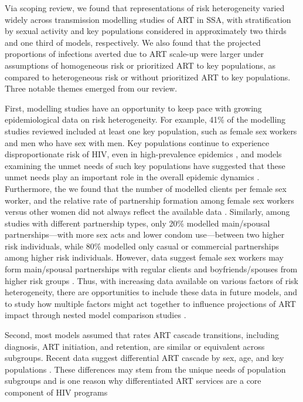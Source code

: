 Via scoping review, we found that representations of risk heterogeneity varied widely across
transmission modelling studies of ART in SSA, with
stratification by sexual activity and key populations considered in approximately
two thirds and one third of models, respectively.
We also found that the projected proportions of infections averted due to ART scale-up were
larger under assumptions of homogeneous risk or prioritized ART to key populations,
as compared to heterogeneous risk or without prioritized ART to key populations.
Three notable themes emerged from our review.
\par
First, modelling studies have an opportunity to keep pace with growing epidemiological data on risk heterogeneity.
For example, 41\% of the modelling studies reviewed included at least one key population,
such as female sex workers and men who have sex with men.
Key populations continue to experience disproportionate risk of HIV, even in high-prevalence epidemics \cite{AIDSinfo},
and models examining the unmet needs of such key populations have suggested that
these unmet needs play an important role in the overall epidemic dynamics \cite{Stone2021,Bekker2015}.
Furthermore, the we found that the number of modelled clients per female sex worker, and
the relative rate of partnership formation among female sex workers versus other women
did not always reflect the available data \cite{Watts2010,Scorgie2012}.
Similarly, among studies with different partnership types, only 20\% modelled
main/spousal partnerships---with more sex acts and lower condom use---between two higher risk individuals,
while 80\% modelled only casual or commercial partnerships among higher risk individuals.
However, data suggest female sex workers may form main/spousal partnerships
with regular clients and boyfriends/spouses from higher risk groups \cite{Scorgie2012}.
Thus, with increasing data available on various factors of risk heterogeneity,
there are opportunities to include these data in future models,
and to study how multiple factors might act together to influence projections of ART impact
through nested model comparison studies \cite{Dodd2010,Hontelez2013}.
\par
Second, most models assumed that rates ART cascade transitions,
including diagnosis, ART initiation, and retention,
are similar or equivalent across subgroups.
Recent data suggest differential ART cascade by sex, age, and key populations
\cite{Lancaster2016,Schwartz2017,Ma2020,Green2020}.
These differences may stem from the unique needs of population subgroups
and is one reason why differentiated ART services are a core component of HIV programs
